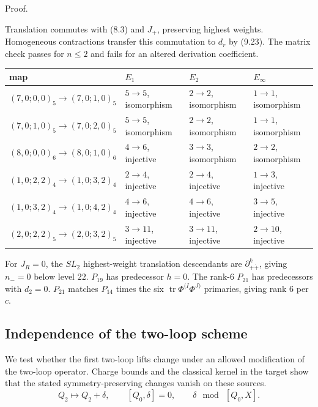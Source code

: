\documentclass[11pt]{article}
\numberwithin{equation}{section}
\numberwithin{figure}{section}
\numberwithin{table}{section}
\begin{document}
\begin{proofbox}
Proof.

Translation commutes with (8.3) and $J_+$, preserving highest weights. Homogeneous contractions transfer this commutation to $d_r$ by (9.23). The matrix check passes for $n\le2$ and fails for an altered derivation coefficient.

{\small\renewcommand{\arraystretch}{1.25}\setlength{\tabcolsep}{4pt}
\begin{xltabular}{\linewidth}{@{}>{\raggedright\arraybackslash}Xlll@{}}
\toprule
map & $E_1$ & $E_2$ & $E_\infty$\\
\midrule\endhead
$(7,0;0,0)_5\to(7,0;1,0)_5$ & $5\to5$, isomorphism & $2\to2$, isomorphism & $1\to1$, isomorphism\\
$(7,0;1,0)_5\to(7,0;2,0)_5$ & $5\to5$, isomorphism & $2\to2$, isomorphism & $1\to1$, isomorphism\\
$(8,0;0,0)_6\to(8,0;1,0)_6$ & $4\to6$, injective & $3\to3$, isomorphism & $2\to2$, isomorphism\\
$(1,0;2,2)_4\to(1,0;3,2)_4$ & $2\to4$, injective & $2\to4$, injective & $1\to3$, injective\\
$(1,0;3,2)_4\to(1,0;4,2)_4$ & $4\to6$, injective & $4\to6$, injective & $3\to5$, injective\\
$(2,0;2,2)_5\to(2,0;3,2)_5$ & $3\to11$, injective & $3\to11$, injective & $2\to10$, injective\\
\bottomrule
\end{xltabular}}

\par\vspace{-\medskipamount}\noindent\hspace*{\fill}\qedsymbol
\end{proofbox}

For $J_R=0$, the $SL_2$ highest-weight translation descendants are $\partial_{+\dot+}^k$, giving $n_-=0$ below level $22$. $P_{19}$ has predecessor $h=0$. The rank-$6$ $P_{21}$ has predecessors with $d_2=0$. $P_{21}$ matches $P_{14}$ times the six $\operatorname{tr}\Phi^{(I}\Phi^{J)}$ primaries, giving rank $6$ per $c$.

\subsection{Independence of the two-loop scheme}\label{sec-E-LS-scheme}

We test whether the first two-loop lifts change under an allowed modification of the two-loop operator. Charge bounds and the classical kernel in the target show that the stated symmetry-preserving changes vanish on these sources.
\begin{equation*}
Q_2\longmapsto Q_2+\delta,\qquad[Q_0,\delta]=0,\qquad\delta\ \bmod\ [Q_0,X].
\end{equation*}
\end{document}
